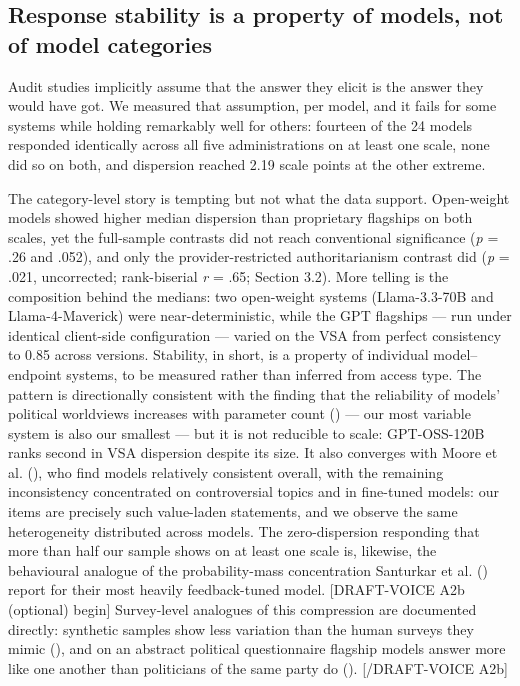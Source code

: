 \documentclass[
]{article}
\newcounter{none} %
\begin{document}
\subsection{Response stability is a property of models, not of model
categories}\label{response-stability-is-a-property-of-models-not-of-model-categories}

Audit studies implicitly assume that the answer they elicit is the
answer they would have got. We measured that assumption, per model, and
it fails for some systems while holding remarkably well for others:
fourteen of the 24 models responded identically across all five
administrations on at least one scale, none did so on both, and
dispersion reached 2.19 scale points at the other extreme.

The category-level story is tempting but not what the data support.
Open-weight models showed higher median dispersion than proprietary
flagships on both scales, yet the full-sample contrasts did not reach
conventional significance (\emph{p} = .26 and .052), and only the
provider-restricted authoritarianism contrast did (\emph{p} = .021,
uncorrected; rank-biserial \emph{r} = .65; Section 3.2). More telling is
the composition behind the medians: two open-weight systems
(Llama-3.3-70B and Llama-4-Maverick) were near-deterministic, while the
GPT flagships --- run under identical client-side configuration ---
varied on the VSA from perfect consistency to 0.85 across versions.
Stability, in short, is a property of individual model--endpoint
systems, to be measured rather than inferred from access type. The
pattern is directionally consistent with the finding that the
reliability of models' political worldviews increases with parameter
count () --- our most
variable system is also our smallest --- but it is not reducible to
scale: GPT-OSS-120B ranks second in VSA dispersion despite its size. It
also converges with Moore et al. (), who
find models relatively consistent overall, with the remaining
inconsistency concentrated on controversial topics and in fine-tuned
models: our items are precisely such value-laden statements, and we
observe the same heterogeneity distributed across models. The
zero-dispersion responding that more than half our sample shows on at
least one scale is, likewise, the behavioural analogue of the
probability-mass concentration Santurkar et al.
() report for their most heavily
feedback-tuned model. {[}DRAFT-VOICE A2b (optional) begin{]}
Survey-level analogues of this compression are documented directly:
synthetic samples show less variation than the human surveys they mimic
(), and on an abstract
political questionnaire flagship models answer more like one another
than politicians of the same party do
(). {[}/DRAFT-VOICE
A2b{]}
\end{document}

